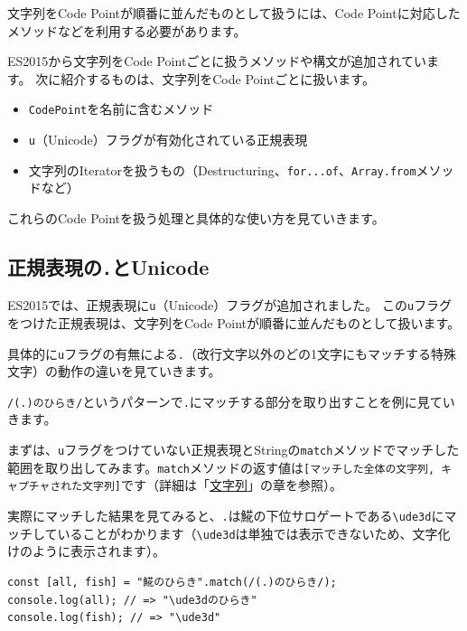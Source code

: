 文字列をCode Pointが順番に並んだものとして扱うには、Code
Pointに対応したメソッドなどを利用する必要があります。

ES2015から文字列をCode Pointごとに扱うメソッドや構文が追加されています。
次に紹介するものは、文字列をCode Pointごとに扱います。

\begin{itemize}
\item
  \texttt{CodePoint}を名前に含むメソッド
\item
  \texttt{u}（Unicode）フラグが有効化されている正規表現
\item
  文字列のIteratorを扱うもの（Destructuring、\texttt{for...of}、\texttt{Array.from}メソッドなど）
\end{itemize}

これらのCode Pointを扱う処理と具体的な使い方を見ていきます。

\hypertarget{regexp-unicode}{%
\subsection{\texorpdfstring{正規表現の\texttt{.}とUnicode}{正規表現の.とUnicode}}\label{regexp-unicode}}

ES2015では、正規表現に\texttt{u}（Unicode）フラグが追加されました。
この\texttt{u}フラグをつけた正規表現は、文字列をCode
Pointが順番に並んだものとして扱います。

具体的に\texttt{u}フラグの有無による\texttt{.}（改行文字以外のどの1文字にもマッチする特殊文字）の動作の違いを見ていきます。

\texttt{/(.)のひらき/}というパターンで\texttt{.}にマッチする部分を取り出すことを例に見ていきます。

まずは、\texttt{u}フラグをつけていない正規表現とStringの\texttt{match}メソッドでマッチした範囲を取り出してみます。\texttt{match}メソッドの返す値は\texttt{[マッチした全体の文字列, キャプチャされた文字列]}です（詳細は「\hyperlink{string}{文字列}」の章を参照）。

実際にマッチした結果を見てみると、\texttt{.}は𩸽の下位サロゲートである\texttt{\textbackslash ude3d}にマッチしていることがわかります（\texttt{\textbackslash ude3d}は単独では表示できないため、文字化けのように表示されます）。

\begin{lstlisting}
const [all, fish] = "𩸽のひらき".match(/(.)のひらき/);
console.log(all); // => "\ude3dのひらき"
console.log(fish); // => "\ude3d"
\end{lstlisting}

